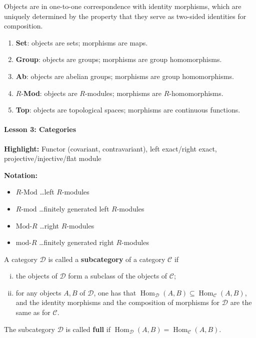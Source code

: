 \documentclass[11pt, a4paper]{report}
\begin{document}
\begin{remark}
Objects are in one-to-one correspondence with identity morphisms, which are uniquely determined by the property that they serve as two-sided identities for composition.
\end{remark}

\begin{example}
\begin{enumerate}
\item \textbf{Set}: objects are sets; morphisms are maps.
\item \textbf{Group}: objects are groups; morphisms are group homomorphisms.
\item \textbf{Ab}: objects are abelian groups; morphisms are group homomorphisms.
\item $R$-\textbf{Mod}: objects are $R$-modules; morphisms are $R$-homomorphisms.
\item \textbf{Top}: objects are topological spaces; morphisms are continuous functions.
\end{enumerate}
\end{example}

\paragraph{Lesson 3: Categories}
\textbf{Highlight:} Functor (covariant, contravariant), left exact/right exact, projective/injective/flat module

\textbf{Notation:}
\begin{itemize}
    \item $R\text{-}\mathrm{Mod}$ \ldots left $R$-modules
    \item $R\text{-}\mathrm{mod}$ \ldots finitely generated left $R$-modules
    \item $\mathrm{Mod}\text{-}R$ \ldots right $R$-modules
    \item $\mathrm{mod}\text{-}R$ \ldots finitely generated right $R$-modules
\end{itemize}

\begin{definition}[Subcategories]
A category $\mathcal{D}$ is called a \textbf{subcategory} of a category $\mathcal{C}$ if
\begin{enumerate}[(i)]
    \item the objects of $\mathcal{D}$ form a subclass of the objects of $\mathcal{C}$;
    \item for any objects $A, B$ of $\mathcal{D}$, one has that $\operatorname{Hom}_{\mathcal{D}}(A, B) \subseteq \operatorname{Hom}_{\mathcal{C}}(A, B)$, and the identity morphisms and the composition of morphisms for $\mathcal{D}$ are the same as for $\mathcal{C}$.
\end{enumerate}
The subcategory $\mathcal{D}$ is called \textbf{full} if $\operatorname{Hom}_{\mathcal{D}}(A, B) = \operatorname{Hom}_{\mathcal{C}}(A, B)$.
\end{definition}
\end{document}
